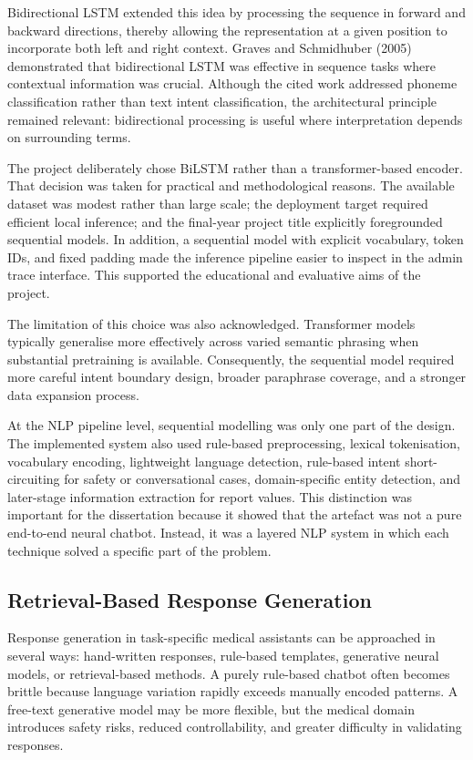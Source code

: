 Bidirectional LSTM extended this idea by processing the sequence in forward and backward directions, thereby allowing the representation at a given position to incorporate both left and right context. Graves and Schmidhuber (2005) demonstrated that bidirectional LSTM was effective in sequence tasks where contextual information was crucial. Although the cited work addressed phoneme classification rather than text intent classification, the architectural principle remained relevant: bidirectional processing is useful where interpretation depends on surrounding terms.

The project deliberately chose BiLSTM rather than a transformer-based encoder. That decision was taken for practical and methodological reasons. The available dataset was modest rather than large scale; the deployment target required efficient local inference; and the final-year project title explicitly foregrounded sequential models. In addition, a sequential model with explicit vocabulary, token IDs, and fixed padding made the inference pipeline easier to inspect in the admin trace interface. This supported the educational and evaluative aims of the project.

The limitation of this choice was also acknowledged. Transformer models typically generalise more effectively across varied semantic phrasing when substantial pretraining is available. Consequently, the sequential model required more careful intent boundary design, broader paraphrase coverage, and a stronger data expansion process.

At the NLP pipeline level, sequential modelling was only one part of the design. The implemented system also used rule-based preprocessing, lexical tokenisation, vocabulary encoding, lightweight language detection, rule-based intent short-circuiting for safety or conversational cases, domain-specific entity detection, and later-stage information extraction for report values. This distinction was important for the dissertation because it showed that the artefact was not a pure end-to-end neural chatbot. Instead, it was a layered NLP system in which each technique solved a specific part of the problem.

\subsection{Retrieval-Based Response Generation}

Response generation in task-specific medical assistants can be approached in several ways: hand-written responses, rule-based templates, generative neural models, or retrieval-based methods. A purely rule-based chatbot often becomes brittle because language variation rapidly exceeds manually encoded patterns. A free-text generative model may be more flexible, but the medical domain introduces safety risks, reduced controllability, and greater difficulty in validating responses.

